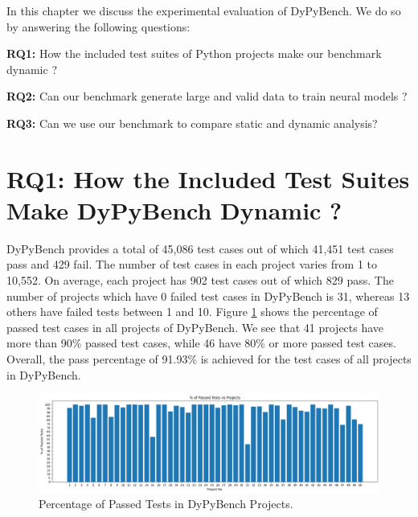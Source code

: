 In this chapter we discuss the experimental evaluation of DyPyBench. We do so by answering the following questions:

\textbf{RQ1:} How the included test suites of Python projects make our benchmark dynamic ?

\textbf{RQ2:} Can our benchmark generate large and valid data to train neural models ?

\textbf{RQ3:} Can we use our benchmark to compare static and dynamic analysis? 

\section{RQ1: How the Included Test Suites Make DyPyBench Dynamic ?}

DyPyBench provides a total of 45,086 test cases out of which 41,451 test cases pass and 429 fail.   
The number of test cases in each project varies from 1 to 10,552.
On average, each project has 902 test cases out of which 829 pass.  
The number of projects which have 0 failed test cases in DyPyBench is 31, whereas 13 others have failed tests between 1 and 10.
Figure \ref{fig:successful_tests} shows the percentage of passed test cases in all projects of DyPyBench.
We see that 41 projects have more than 90\% passed test cases, while 46 have 80\% or more passed test cases.
Overall, the pass percentage of 91.93\% is achieved for the test cases of all projects in DyPyBench.

\begin{figure}[ht]
    \centering
    \includegraphics[width=1\linewidth]{figures/evaluation/perc_passed_tests.png}
    \caption[Passed Test Case Percentage ]{\label{fig:successful_tests}Percentage of Passed Tests in DyPyBench Projects.}
\end{figure}

